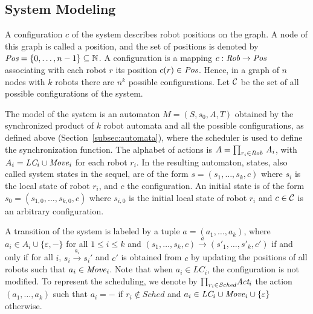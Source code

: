  \subsection{System Modeling} \label{sec:mod:composition} 
 A configuration $c$ of the system describes robot positions on the graph.  
 A node of this graph is called a position, and the set of positions 
 is denoted by $\textit{Pos} = \{0,\dots,n-1\} \subseteq \mathbb{N}$.
 A configuration is a mapping $c: \textit{Rob} \rightarrow \textit{Pos}$
 associating with each robot $r$ its position $c(r) \in
 \textit{Pos}$. Hence, in a graph of $n$ nodes with $k$ robots there
 are $n^k$ possible configurations.
 Let $\mathcal{C}$ be the set of all possible configurations of the system.
 
 The model of the system is an automaton $M =(S, s_0, A, T)$ obtained
 by the synchronized product of $k$ robot automata and all the
 possible configurations, as defined above (Section~\ref{subsec:automata}), 
 where the scheduler is used to define the synchronization function. The
 alphabet of actions is $A = {\prod_{r_i \in \textit{Rob}}}\
 \textit{A}_i$, with $A_i = \textit{LC}_i \cup \mathit{Move}_i$ for
 each robot $r_i$. In the resulting automaton, states, also called system states in the sequel, are of the form $s =
 (s_1,\dots,s_k,c)$ where $s_i$ is the local state of robot $r_i$, and
 $c$ the configuration. An initial state is of the form
 $s_0=(s_{1,0},\dots,s_{k,0},c)$ where $s_{i,0}$ is the initial local
 state of robot $r_i$ and $c\in \mathcal{C}$ is an arbitrary configuration.

 A transition of the system is labeled by a tuple $a=(a_1, \ldots,
 a_k)$, where $a_i \in A_i \cup \{\varepsilon, -\}$ for all $1 \leq i
 \leq k$ and $(s_1,\dots,s_k,c) \xrightarrow{a} (s'_1,\dots,s'_k,c')$
 if and only if for all $i$, $s_i \xrightarrow{a_i} s_i'$ and $c'$ is
 obtained from $c$ by updating the positions of all robots such that
 $a_i \in \mathit{Move}_i$. Note that when $a_i \in \textit{LC}_i$, the configuration is not modified.
 To represent the scheduling, we denote by
 ${\prod_{r_i \in \textit{Sched}}} \textit{Act}_i$ the action $(a_1,
 \ldots, a_k)$ such that $a_i = -$ if $r_i \notin Sched$ and $a_i \in
 \textit{LC}_i \cup \mathit{Move}_i \cup \{\varepsilon\}$ otherwise.
 
 
 
